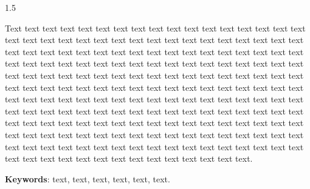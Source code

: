 
\begin{resumo}
\begin{Spacing}{1.5}

Text text text text text text text text text text text text text text text text text text text text text text text text text text text text text text text text text text text text text text text text text text text text text text text text text text text text text text text text text text text text text text text text text text text text text text text text text text text text text text text text text text text text text text text text text text text text text text text text text text text text text text text text text text text text text text text text text text text text text text text text text text text text text text text text text text text text text text text text text text text text text text text text text text text text text text text text text text text text text text text text text text text text text text text text text text text text text text text text text text text text text text text text text text text text text text text text text text text text text text text text text.

\end{Spacing}

\vspace{1cm}
\textbf{Keywords}: text, text, text, text, text, text.

\end{resumo}



